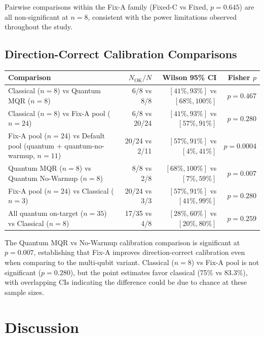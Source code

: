 \documentclass[10pt,a4paper]{article}
\begin{document}
Pairwise comparisons within the Fix-A family (Fixed-C vs Fixed, $p=0.645$) are
all non-significant at $n=8$, consistent with the power limitations observed
throughout the study.

\subsection{Direction-Correct Calibration Comparisons}

\begin{center}
\setlength{\tabcolsep}{6pt}
\begin{tabular}{lrrr}
\toprule
Comparison & $N_\text{OK}/N$ & Wilson 95\% CI & Fisher $p$ \\
\midrule
Classical ($n=8$) vs Quantum MQR ($n=8$)
           & 6/8 vs 8/8 & $[41\%,93\%]$ vs $[68\%,100\%]$
           & $p=0.467$ \\
\midrule
Classical ($n=8$) vs Fix-A pool ($n=24$)
           & 6/8 vs 20/24 & $[41\%,93\%]$ vs $[57\%,91\%]$
           & $p=0.280$ \\
\midrule
Fix-A pool ($n=24$) vs Default pool (quantum + quantum-no-warmup, $n=11$)
           & 20/24 vs 2/11 & $[57\%,91\%]$ vs $[4\%,41\%]$
           & $p=\mathbf{0.0004}$ \\[2pt]
\midrule
Quantum MQR ($n=8$) vs Quantum No-Warmup ($n=8$)
           & 8/8 vs 2/8 & $[68\%,100\%]$ vs $[7\%,59\%]$
           & $p=\mathbf{0.007}$ \\
\midrule
Fix-A pool ($n=24$) vs Classical ($n=3$)
           & 20/24 vs 3/3 & $[57\%,91\%]$ vs $[41\%,99\%]$
           & $p=0.280$ \\
\midrule
All quantum on-target ($n=35$) vs Classical ($n=8$)
           & 17/35 vs 4/8 & $[28\%,60\%]$ vs $[20\%,80\%]$
           & $p=0.259$ \\
\bottomrule
\end{tabular}
\end{center}

The Quantum MQR vs No-Warmup calibration comparison is significant at $p=0.007$,
establishing that Fix-A improves direction-correct calibration even when
comparing to the multi-qubit variant. Classical ($n=8$) vs Fix-A pool is not
significant ($p=0.280$), but the point estimates favor classical (75\% vs 83.3\%),
with overlapping CIs indicating the difference could be due to chance at these
sample sizes.

\section{Discussion}
\end{document}
